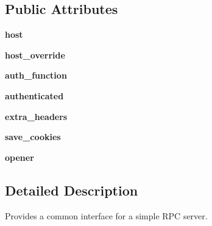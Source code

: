 \subsection*{Public Attributes}
\begin{DoxyCompactItemize}
\item 
{\bfseries host}\hypertarget{classupload_1_1AbstractRpcServer_ab7188d827e2faddcf970f524f5856192}{}\label{classupload_1_1AbstractRpcServer_ab7188d827e2faddcf970f524f5856192}

\item 
{\bfseries host\+\_\+override}\hypertarget{classupload_1_1AbstractRpcServer_a783a4a7e4ffb776a57a3f267300a213b}{}\label{classupload_1_1AbstractRpcServer_a783a4a7e4ffb776a57a3f267300a213b}

\item 
{\bfseries auth\+\_\+function}\hypertarget{classupload_1_1AbstractRpcServer_aee0090a3bcf07b913a7dd596a5dabb8f}{}\label{classupload_1_1AbstractRpcServer_aee0090a3bcf07b913a7dd596a5dabb8f}

\item 
{\bfseries authenticated}\hypertarget{classupload_1_1AbstractRpcServer_a692955750c802e461c6336d3000cd365}{}\label{classupload_1_1AbstractRpcServer_a692955750c802e461c6336d3000cd365}

\item 
{\bfseries extra\+\_\+headers}\hypertarget{classupload_1_1AbstractRpcServer_adbbf0109afc13d58d7815fa143cb779f}{}\label{classupload_1_1AbstractRpcServer_adbbf0109afc13d58d7815fa143cb779f}

\item 
{\bfseries save\+\_\+cookies}\hypertarget{classupload_1_1AbstractRpcServer_affe342205c4647d41b127f5a5634858b}{}\label{classupload_1_1AbstractRpcServer_affe342205c4647d41b127f5a5634858b}

\item 
{\bfseries opener}\hypertarget{classupload_1_1AbstractRpcServer_aa931446476e0e86f3ade7fef0a0aea5a}{}\label{classupload_1_1AbstractRpcServer_aa931446476e0e86f3ade7fef0a0aea5a}

\end{DoxyCompactItemize}


\subsection{Detailed Description}
\begin{DoxyVerb}Provides a common interface for a simple RPC server.\end{DoxyVerb}
 

